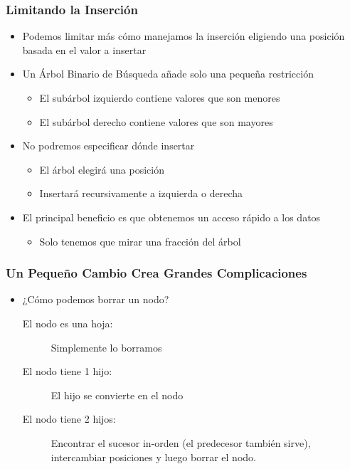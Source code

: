 \documentclass[11pt]{beamer}
\begin{document}
	\begin{frame}\frametitle{Limitando la Inserción}
	\begin{itemize}
	\item Podemos limitar más cómo manejamos la inserción eligiendo una posición basada en el valor a insertar
	\item Un Árbol Binario de Búsqueda añade solo una pequeña restricción
	    \begin{itemize}
	    \item El subárbol izquierdo contiene valores que son menores
	    \item El subárbol derecho contiene valores que son mayores
	    \end{itemize}
	\item No podremos especificar dónde insertar
	    \begin{itemize}
	    \item El árbol elegirá una posición
	    \item Insertará recursivamente a izquierda o derecha
	    \end{itemize}
	\item El principal beneficio es que obtenemos un acceso rápido a los datos
	    \begin{itemize}
	    \item Solo tenemos que mirar una fracción del árbol
	    \end{itemize}
	\end{itemize}
	\end{frame}

	\begin{frame}\frametitle{Un Pequeño Cambio Crea Grandes Complicaciones}
	\begin{itemize}
	\item ¿Cómo podemos borrar un nodo?
	\begin{description}
	\item[El nodo es una hoja:] Simplemente lo borramos
	\item[El nodo tiene 1 hijo:] El hijo se convierte en el nodo
	\item[El nodo tiene 2 hijos:] Encontrar el sucesor in-orden (el predecesor también sirve), intercambiar posiciones y luego borrar el nodo.
	\end{description}
	\end{itemize}
	\end{frame}

	
\end{document}
